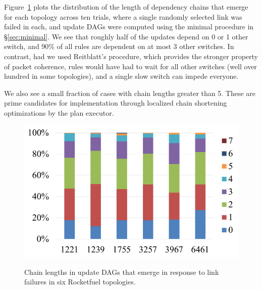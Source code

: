Figure~\ref{fig:as} plots the distribution of the length of dependency chains that emerge for each topology across ten trials, where a single randomly selected link was failed in each, and update DAGs were computed using the minimal procedure in \S\ref{sec:minimal}. We see that roughly half of the updates depend on 0 or 1 other switch, and 90\% of all rules are dependent on at most 3 other switches. In contrast, had we used Reitblatt's procedure, which provides the stronger property of packet coherence, rules would have had to wait for all other switches (well over hundred in some topologies), and a single slow switch can impede everyone.

We also see a small fraction of cases with chain lengths greater than 5. These are prime candidates for implementation through localized chain shortening optimizations by the plan executor.


\begin{figure}[t!]
  \centering
  \includegraphics[width=\columnwidth]{figures/as.png}\\
  \caption{Chain lengths in update DAGs that emerge in response to link failures in six Rocketfuel topologies.}\label{fig:as}
\end{figure}

